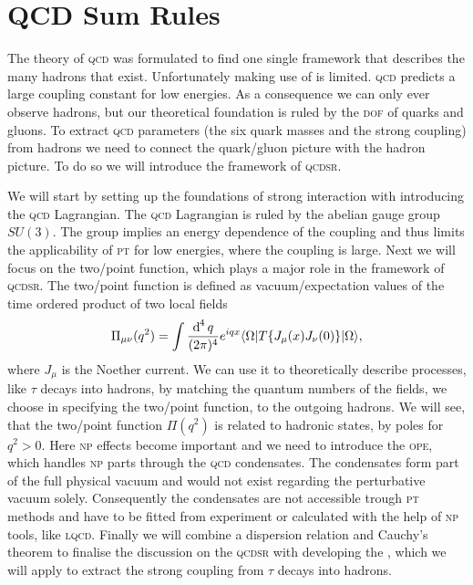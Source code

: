 \documentclass[../../index.tex]{subfiles}
\begin{document}
\chapter{QCD Sum Rules}
\label{ch:theoreticalBackground}
The theory of \textsc{qcd} was formulated to find one single framework that
describes the many hadrons that exist. Unfortunately making use of
 is limited. \textsc{qcd} predicts a
large coupling constant for low energies. As a consequence we can only ever
observe hadrons, but our theoretical foundation is ruled by the \textsc{dof} of
quarks and gluons. To extract \textsc{qcd} parameters (the six quark masses and
the strong coupling) from hadrons we need to connect the quark\-/gluon picture
with the hadron picture. To do so we will introduce the framework of
\textsc{qcdsr}.

We will start by setting up the foundations of strong interaction with
introducing the \textsc{qcd} Lagrangian. The \textsc{qcd} Lagrangian is ruled by
the abelian gauge group \(SU(3)\). The group implies an energy dependence of the
coupling and thus limits the applicability of \textsc{pt} for low energies,
where the coupling is large. Next we will focus on the two\-/point function,
which plays a major role in the framework of \textsc{qcdsr}. The two\-/point
function is defined as vacuum\-/expectation values of the time ordered product
of two local fields
\begin{equation}
  \Pi_{\mu\nu}(q^2) = \int\fdif{q} e^{iqx} \langle\Omega\vert T\{ J_\mu(x) J_\nu(0) \} \vert\Omega\rangle,
\end{equation}
where \(J_\mu\) is the Noether current. We can use it to theoretically describe
processes, like \(\tau\) decays into hadrons, by matching the quantum numbers of
the fields, we choose in specifying the two\-/point function, to the outgoing
hadrons. We will see, that the two\-/point function \(\Pi(q^2)\) is related to
hadronic states, by poles for \(q^2> 0\). Here \textsc{np} effects become
important and we need to introduce the \textsc{ope}, which handles \textsc{np}
parts through the \textsc{qcd} condensates. The condensates form part of the
full physical vacuum and would not exist regarding the perturbative vacuum
solely. Consequently the condensates are not accessible trough \textsc{pt}
methods and have to be fitted from experiment or calculated with the help of
\textsc{np} tools, like \textsc{lqcd}. Finally we will combine a dispersion
relation and Cauchy's theorem to finalise the discussion on the \textsc{qcdsr}
with developing the , which we will apply
to extract the strong coupling from \(\tau\) decays into hadrons.
\end{document}
